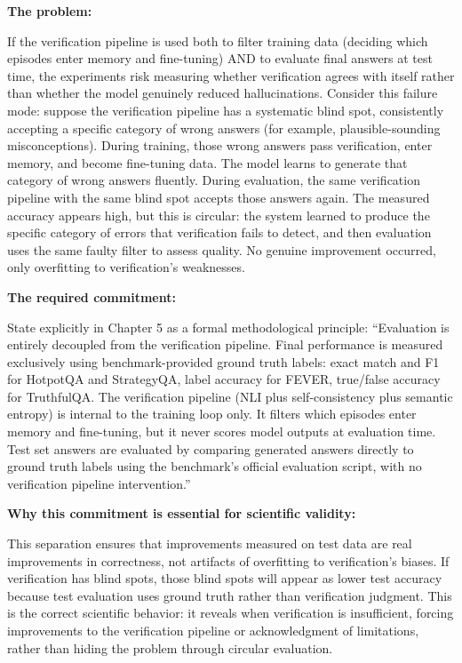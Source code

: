 \documentclass[11pt,a4paper]{article}
\newcommand{\implementbox}[2]{%
\begin{tcolorbox}[enhanced,breakable,
  colback=LightSlate,colframe=Slate,boxrule=1.5pt,arc=4pt,
  left=8pt,right=8pt,top=6pt,bottom=6pt,
  title={\bfseries\small\color{white}#1},
  attach boxed title to top left={yshift=-2mm,xshift=6mm},
  boxed title style={colback=Slate,arc=3pt,boxrule=0pt,
    left=4pt,right=4pt,top=2pt,bottom=2pt}]
#2
\end{tcolorbox}}
\begin{document}
\implementbox{IMPLEMENTATION CONCERN 3: Strict Separation of Training and Evaluation Pipelines}{
\textbf{The problem:}

If the verification pipeline is used both to filter training data (deciding which episodes enter memory and fine-tuning) AND to evaluate final answers at test time, the experiments risk measuring whether verification agrees with itself rather than whether the model genuinely reduced hallucinations. Consider this failure mode: suppose the verification pipeline has a systematic blind spot, consistently accepting a specific category of wrong answers (for example, plausible-sounding misconceptions). During training, those wrong answers pass verification, enter memory, and become fine-tuning data. The model learns to generate that category of wrong answers fluently. During evaluation, the same verification pipeline with the same blind spot accepts those answers again. The measured accuracy appears high, but this is circular: the system learned to produce the specific category of errors that verification fails to detect, and then evaluation uses the same faulty filter to assess quality. No genuine improvement occurred, only overfitting to verification's weaknesses.

\textbf{The required commitment:}

State explicitly in Chapter 5 as a formal methodological principle: ``Evaluation is entirely decoupled from the verification pipeline. Final performance is measured exclusively using benchmark-provided ground truth labels: exact match and F1 for HotpotQA and StrategyQA, label accuracy for FEVER, true/false accuracy for TruthfulQA. The verification pipeline (NLI plus self-consistency plus semantic entropy) is internal to the training loop only. It filters which episodes enter memory and fine-tuning, but it never scores model outputs at evaluation time. Test set answers are evaluated by comparing generated answers directly to ground truth labels using the benchmark's official evaluation script, with no verification pipeline intervention.''

\textbf{Why this commitment is essential for scientific validity:}

This separation ensures that improvements measured on test data are real improvements in correctness, not artifacts of overfitting to verification's biases. If verification has blind spots, those blind spots will appear as lower test accuracy because test evaluation uses ground truth rather than verification judgment. This is the correct scientific behavior: it reveals when verification is insufficient, forcing improvements to the verification pipeline or acknowledgment of limitations, rather than hiding the problem through circular evaluation.

}
\end{document}
